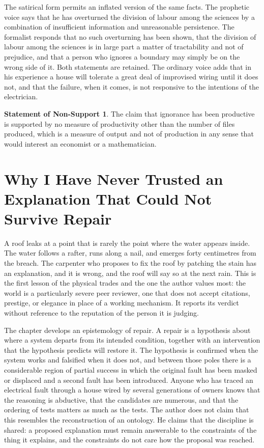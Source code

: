 \documentclass[11pt,openany,twoside]{book}
\theoremstyle{plain}
\theoremstyle{definition}
\newtheorem{nonsupport}{Statement of Non-Support}
\theoremstyle{remark}
\begin{document}
The satirical form permits an inflated version of the same facts. The prophetic voice says that he has overturned the division of labour among the sciences by a combination of insufficient information and unreasonable persistence. The formalist responds that no such overturning has been shown, that the division of labour among the sciences is in large part a matter of tractability and not of prejudice, and that a person who ignores a boundary may simply be on the wrong side of it. Both statements are retained. The ordinary voice adds that in his experience a house will tolerate a great deal of improvised wiring until it does not, and that the failure, when it comes, is not responsive to the intentions of the electrician.

\begin{nonsupport}
The claim that ignorance has been productive is supported by no measure of productivity other than the number of files produced, which is a measure of output and not of production in any sense that would interest an economist or a mathematician.
\end{nonsupport}

\chapter{Why I Have Never Trusted an Explanation That Could Not Survive Repair}

A roof leaks at a point that is rarely the point where the water appears inside. The water follows a rafter, runs along a nail, and emerges forty centimetres from the breach. The carpenter who proposes to fix the roof by patching the stain has an explanation, and it is wrong, and the roof will say so at the next rain. This is the first lesson of the physical trades and the one the author values most: the world is a particularly severe peer reviewer, one that does not accept citations, prestige, or elegance in place of a working mechanism. It reports its verdict without reference to the reputation of the person it is judging.

The chapter develops an epistemology of repair. A repair is a hypothesis about where a system departs from its intended condition, together with an intervention that the hypothesis predicts will restore it. The hypothesis is confirmed when the system works and falsified when it does not, and between those poles there is a considerable region of partial success in which the original fault has been masked or displaced and a second fault has been introduced. Anyone who has traced an electrical fault through a house wired by several generations of owners knows that the reasoning is abductive, that the candidates are numerous, and that the ordering of tests matters as much as the tests. The author does not claim that this resembles the reconstruction of an ontology. He claims that the discipline is shared: a proposed explanation must remain answerable to the constraints of the thing it explains, and the constraints do not care how the proposal was reached.
\end{document}
